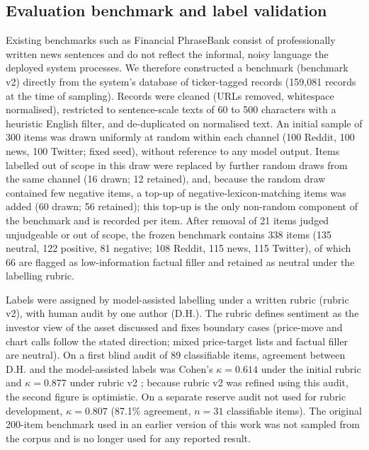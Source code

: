\documentclass{aims}
\numberwithin{equation}{section}
\begin{document}
\subsection{Evaluation benchmark and label validation}\label{sec:benchmark}
Existing benchmarks such as Financial PhraseBank \citep{malo2014} consist of
professionally written news sentences and do not reflect the informal, noisy
language the deployed system processes. We therefore constructed a benchmark
(benchmark v2) directly from the system's database of ticker-tagged records
(159{,}081 records at the time of sampling). Records were cleaned (URLs removed,
whitespace normalised), restricted to sentence-scale texts of 60 to 500 characters
with a heuristic English filter, and de-duplicated on normalised text. An initial
sample of 300 items was drawn uniformly at random within each channel (100 Reddit,
100 news, 100 Twitter; fixed seed), without reference to any model output.
Items labelled out of scope in this draw were replaced by further random draws
from the same channel (16 drawn; 12 retained), and, because the random draw contained few negative items, a top-up of
negative-lexicon-matching items was added (60 drawn; 56 retained); this top-up is
the only non-random component of the benchmark and is recorded per item. After
removal of 21 items judged unjudgeable or out of scope, the frozen benchmark
contains 338 items (135 neutral, 122 positive, 81 negative; 108 Reddit, 115 news,
115 Twitter), of which 66 are flagged as low-information factual filler and retained
as neutral under the labelling rubric.

Labels were assigned by model-assisted labelling under a written rubric (rubric
v2), with human audit by one author (D.H.). The rubric defines sentiment as the
investor view of the asset discussed and fixes boundary cases (price-move and chart
calls follow the stated direction; mixed price-target lists and factual filler are
neutral). On a first blind audit of 89 classifiable items, agreement between D.H.
and the model-assisted labels was Cohen's $\kappa = 0.614$ under the initial rubric
and $\kappa = 0.877$ under rubric v2 \citep{cohen1960}; because rubric v2 was refined
using this audit, the second figure is optimistic. On a separate reserve audit not
used for rubric development, $\kappa = 0.807$ (87.1\% agreement, $n = 31$
classifiable items). The original 200-item benchmark used in an earlier version of
this work was not sampled from the corpus and is no longer used for any reported
result.
\end{document}
